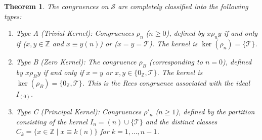 \documentclass[11pt, a4paper]{article}
\theoremstyle{plain}
\newtheorem{theorem}{Theorem}[section]
\theoremstyle{definition}
\numberwithin{equation}{section}
\newcommand{\Z}{\mathbb{Z}}
\newcommand{\Tobj}{\mathcal{T}} %
\newcommand{\SemiringS}{\mathcal{S}}
\begin{document}
\begin{theorem}\label{thm:congruence_classification_S}
The congruences on $\SemiringS$ are completely classified into the following types:

\begin{enumerate}
    \item Type A (Trivial Kernel): Congruences $\rho_n$ ($n\ge 0$), defined by $x \rho_n y$ if and only if ($x, y \in \Z$ and $x\equiv y(n)$) or ($x=y=\Tobj$). The kernel is $\ker(\rho_n)=\{\Tobj\}$.
    \item Type B (Zero Kernel): The congruence $\rho_B$ (corresponding to $n=0$), defined by $x \rho_B y$ if and only if $x=y$ or $x, y \in \{0_{\Z}, \Tobj\}$. The kernel is $\ker(\rho_B)=\{0_{\Z}, \Tobj\}$. This is the Rees congruence associated with the ideal $I_{(0)}$.
    \item Type C (Principal Kernel): Congruences $\rho'_n$ ($n\ge 1$), defined by the partition consisting of the kernel $I_n=(n)\cup\{\Tobj\}$ and the distinct classes $C_k = \{x\in\Z \mid x\equiv k(n)\}$ for $k=1,\dots, n-1$.
\end{enumerate}
\end{theorem}
\end{document}
